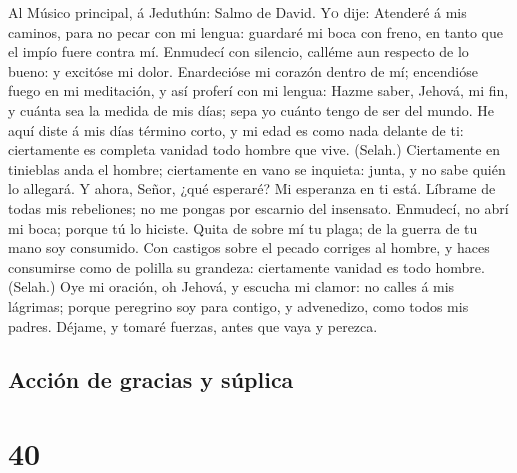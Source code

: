  Al Músico principal, á Jeduthún: Salmo de David.
\textsc{Yo} dije: Atenderé á mis caminos, para no pecar con mi lengua:
guardaré mi boca con freno, en tanto que el impío fuere contra mí.
 Enmudecí con silencio, calléme aun respecto de lo bueno:
y excitóse mi dolor.  Enardecióse mi corazón dentro de mí;
encendióse fuego en mi meditación, y así proferí con mi lengua:
 Hazme saber, Jehová, mi fin, y cuánta sea la medida de
mis días; sepa yo cuánto tengo de ser del mundo.  He aquí
diste á mis días término corto, y mi edad es como nada delante de ti:
ciertamente es completa vanidad todo hombre que vive. (Selah.)
 Ciertamente en tinieblas anda el hombre; ciertamente en
vano se inquieta: junta, y no sabe quién lo allegará.  Y
ahora, Señor, ¿qué esperaré? Mi esperanza en ti está. 
Líbrame de todas mis rebeliones; no me pongas por escarnio del
insensato.  Enmudecí, no abrí mi boca; porque tú lo
hiciste.  Quita de sobre mí tu plaga; de la guerra de tu
mano soy consumido.  Con castigos sobre el pecado
corriges al hombre, y haces consumirse como de polilla su grandeza:
ciertamente vanidad es todo hombre. (Selah.)  Oye mi
oración, oh Jehová, y escucha mi clamor: no calles á mis lágrimas;
porque peregrino soy para contigo, y advenedizo, como todos mis padres.
 Déjame, y tomaré fuerzas, antes que vaya y perezca.

\hypertarget{acciuxf3n-de-gracias-y-suxfaplica}{%
\subsection{Acción de gracias y
súplica}\label{acciuxf3n-de-gracias-y-suxfaplica}}

\hypertarget{section-39}{%
\section{40}\label{section-39}}


